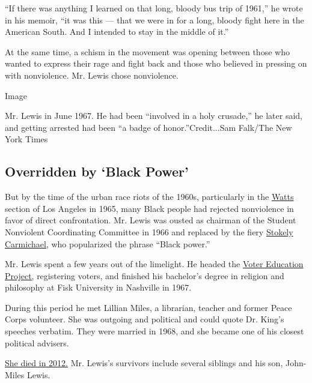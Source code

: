 ``If there was anything I learned on that long, bloody bus trip of
1961,'' he wrote in his memoir, ``it was this --- that we were in for a
long, bloody fight here in the American South. And I intended to stay in
the middle of it.''

At the same time, a schism in the movement was opening between those who
wanted to express their rage and fight back and those who believed in
pressing on with nonviolence. Mr. Lewis chose nonviolence.

Image

Mr. Lewis in June 1967. He had been ``involved in a holy crusade,'' he
later said, and getting arrested had been ``a badge of
honor.''Credit...Sam Falk/The New York Times

\hypertarget{overridden-by-black-power}{%
\subsection{Overridden by `Black
Power'}\label{overridden-by-black-power}}

But by the time of the urban race riots of the 1960s, particularly in
the
\href{https://learning.blogs.nytimes.com/2011/08/11/aug-11-1965-riots-in-the-watts-section-of-los-angeles/}{Watts}
section of Los Angeles in 1965, many Black people had rejected
nonviolence in favor of direct confrontation. Mr. Lewis was ousted as
chairman of the Student Nonviolent Coordinating Committee in 1966 and
replaced by the fiery
\href{https://www.nytimes.com/1998/11/16/us/stokely-carmichael-rights-leader-who-coined-black-power-dies-at-57.html}{Stokely
Carmichael}, who popularized the phrase ``Black power.''

Mr. Lewis spent a few years out of the limelight. He headed the
\href{https://www.georgiaencyclopedia.org/articles/history-archaeology/voter-education-project}{Voter
Education Project,} registering voters, and finished his bachelor's
degree in religion and philosophy at Fisk University in Nashville in
1967.

During this period he met Lillian Miles, a librarian, teacher and former
Peace Corps volunteer. She was outgoing and political and could quote
Dr. King's speeches verbatim. They were married in 1968, and she became
one of his closest political advisers.

\href{https://patch.com/georgia/decatur/congressman-john-lewis-wife-passed-away-monday-morning-1231}{She
died in 2012.} Mr. Lewis's survivors include several siblings and his
son, John-Miles Lewis.

